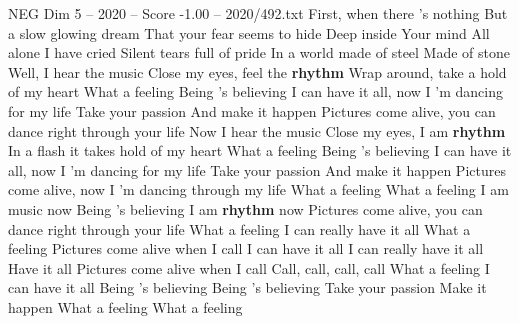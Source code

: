 \begin{textsample}{NEG Dim 5 – 2020 – Score -1.00 – 2020/492.txt}  \label{ex:f5_neg_029}
First, when there 's nothing But a slow glowing dream That your fear seems to hide Deep inside Your mind All alone I have cried Silent tears full of pride In a world made of steel Made of stone Well, I hear the music Close my eyes, feel the \textbf{rhythm} Wrap around, take a hold of my heart What a feeling Being 's believing I can have it all, now I 'm dancing for my life Take your passion And make it happen Pictures come alive, you can dance right through your life Now I hear the music Close my eyes, I am \textbf{rhythm} In a flash it takes hold of my heart What a feeling Being 's believing I can have it all, now I 'm dancing for my life Take your passion And make it happen Pictures come alive, now I 'm dancing through my life What a feeling What a feeling I am music now Being 's believing I am \textbf{rhythm} now Pictures come alive, you can dance right through your life What a feeling I can really have it all What a feeling Pictures come alive when I call I can have it all I can really have it all Have it all Pictures come alive when I call Call, call, call, call What a feeling I can have it all Being 's believing Being 's believing Take your passion Make it happen What a feeling What a feeling

\end{textsample}
